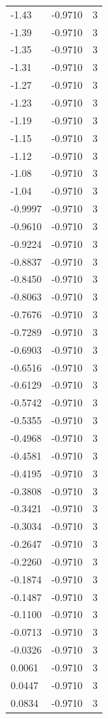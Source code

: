 \begin{longtable}{lrr}
  -1.43 & -0.9710 & 3 \\
  -1.39 & -0.9710 & 3 \\
  -1.35 & -0.9710 & 3 \\
  -1.31 & -0.9710 & 3 \\
  -1.27 & -0.9710 & 3 \\
  -1.23 & -0.9710 & 3 \\
  -1.19 & -0.9710 & 3 \\
  -1.15 & -0.9710 & 3 \\
  -1.12 & -0.9710 & 3 \\
  -1.08 & -0.9710 & 3 \\
  -1.04 & -0.9710 & 3 \\
  -0.9997 & -0.9710 & 3 \\
  -0.9610 & -0.9710 & 3 \\
  -0.9224 & -0.9710 & 3 \\
  -0.8837 & -0.9710 & 3 \\
  -0.8450 & -0.9710 & 3 \\
  -0.8063 & -0.9710 & 3 \\
  -0.7676 & -0.9710 & 3 \\
  -0.7289 & -0.9710 & 3 \\
  -0.6903 & -0.9710 & 3 \\
  -0.6516 & -0.9710 & 3 \\
  -0.6129 & -0.9710 & 3 \\
  -0.5742 & -0.9710 & 3 \\
  -0.5355 & -0.9710 & 3 \\
  -0.4968 & -0.9710 & 3 \\
  -0.4581 & -0.9710 & 3 \\
  -0.4195 & -0.9710 & 3 \\
  -0.3808 & -0.9710 & 3 \\
  -0.3421 & -0.9710 & 3 \\
  -0.3034 & -0.9710 & 3 \\
  -0.2647 & -0.9710 & 3 \\
  -0.2260 & -0.9710 & 3 \\
  -0.1874 & -0.9710 & 3 \\
  -0.1487 & -0.9710 & 3 \\
  -0.1100 & -0.9710 & 3 \\
  -0.0713 & -0.9710 & 3 \\
  -0.0326 & -0.9710 & 3 \\
  0.0061 & -0.9710 & 3 \\
  0.0447 & -0.9710 & 3 \\
  0.0834 & -0.9710 & 3 \\

\end{longtable}
